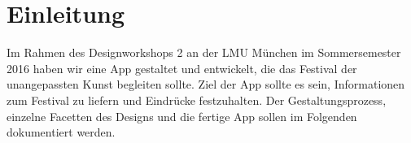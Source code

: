 \section{Einleitung}
Im Rahmen des Designworkshops 2 an der LMU München im Sommersemester 2016 haben wir eine App gestaltet und entwickelt, die das Festival der unangepassten Kunst begleiten sollte. Ziel der App sollte es sein, Informationen zum Festival zu liefern und Eindrücke festzuhalten. Der Gestaltungsprozess, einzelne Facetten des Designs und die fertige App sollen im Folgenden dokumentiert werden.